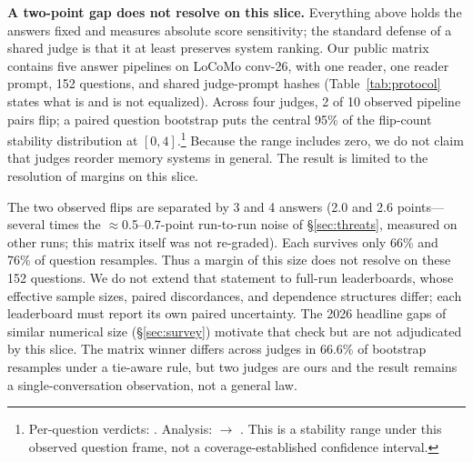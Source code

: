 \documentclass[11pt]{article}
\begin{document}
\textbf{A two-point gap does not resolve on this slice.} Everything above holds the answers fixed and measures absolute score sensitivity; the standard defense of a shared judge is that it at least preserves system ranking. Our public matrix contains five answer pipelines on LoCoMo conv-26, with one reader, one reader prompt, 152 questions, and shared judge-prompt hashes (Table~\ref{tab:protocol} states what is and is not equalized). Across four judges, 2 of 10 observed pipeline pairs flip; a paired question bootstrap puts the central 95\% of the flip-count stability distribution at $[0,4]$.\footnote{Per-question verdicts: . Analysis:  $\to$ . This is a stability range under this observed question frame, not a coverage-established confidence interval.} Because the range includes zero, we do not claim that judges reorder memory systems in general. The result is limited to the resolution of margins on this slice.

The two observed flips are separated by 3 and 4 answers (2.0 and 2.6 points---several times the $\approx$0.5--0.7-point run-to-run noise of \S\ref{sec:threats}, measured on other runs; this matrix itself was not re-graded). Each survives only 66\% and 76\% of question resamples. Thus a margin of this size does not resolve on these 152 questions. We do not extend that statement to full-run leaderboards, whose effective sample sizes, paired discordances, and dependence structures differ; each leaderboard must report its own paired uncertainty. The 2026 headline gaps of similar numerical size (\S\ref{sec:survey}) motivate that check but are not adjudicated by this slice. The matrix winner differs across judges in 66.6\% of bootstrap resamples under a tie-aware rule, but two judges are ours and the result remains a single-conversation observation, not a general law.
\end{document}
